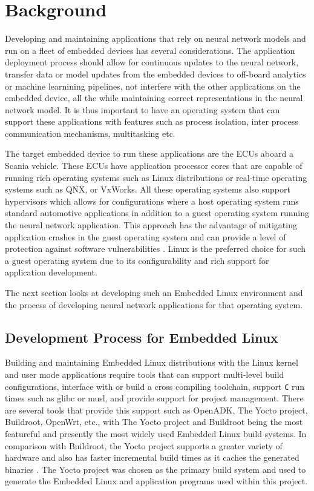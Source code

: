 
\chapter{Background}

Developing and maintaining applications that rely on neural network models and run on a fleet of embedded devices has several considerations. The application deployment process should allow for continuous updates to the neural network, transfer data or model updates from the embedded devices to off-board analytics or machine learnining pipelines, not interfere with the other applications on the embedded device, all the while maintaining correct representations in the neural network model. It is thus important to have an operating system that can support these applications with features such as process isolation, inter process communication mechanisms, multitasking etc.

The target embedded device to run these applications are the ECUs aboard a Scania vehicle. These ECUs have application processor cores that are capable of running rich operating systems such as Linux distributions or real-time operating systems such as QNX, or VxWorks. All these operating systems also support hypervisors which allows for configurations where a host operating system runs standard automotive applications in addition to a guest operating system running the neural network application. This approach has the advantage of mitigating application crashes in the guest operating system and can provide a level of protection against software vulnerabilities \cite{Linux-guest-os}. Linux is the preferred choice for such a guest operating system due to its configurability and rich support for application development.

The next section looks at developing such an Embedded Linux environment and the process of developing neural network applications for that operating system.

\section{Development Process for Embedded Linux}

Building and maintaining Embedded Linux distributions with the Linux kernel and user mode applications require tools that can support multi-level build configurations, interface with or build a cross compiling toolchain, support \texttt{C} run times such as glibc or musl, and provide support for project management. There are several tools that provide this support such as OpenADK, The Yocto project, Buildroot, OpenWrt, etc., with The Yocto project and Buildroot being the most featureful and presently the most widely used Embedded Linux build systems. In comparison with Buildroot, the Yocto project supports a greater variety of hardware and also has faster incremental build times as it caches the generated binaries \cite{yocto}. The Yocto project was chosen as the primary build system and used to generate the Embedded Linux and application programs used within this project.


